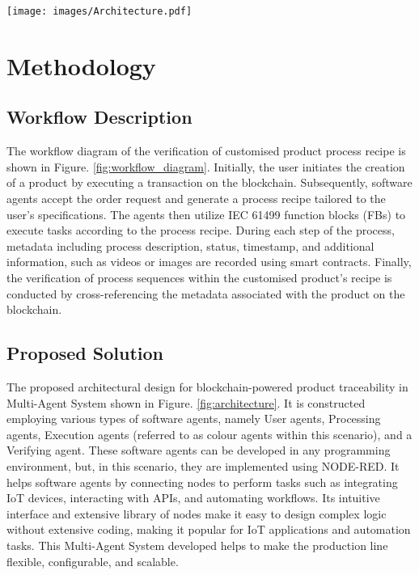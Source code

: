 \documentclass[conference]{IEEEtran}
\begin{document}
\begin{figure*}[!t]
	\centering
	\texttt{[image: images/Architecture.pdf]}
	\caption{Fostering Transparency: Architectural Design for Blockchain-Powered Product Traceability in Multi-Agent System}
	\label{fig:architecture}
\end{figure*}


\section{Methodology}
\label{sec:methodology}

\subsection{Workflow Description}

The workflow diagram of the verification of customised product process recipe is shown in Figure. \ref{fig:workflow_diagram}. Initially, the user initiates the creation of a product by executing a transaction on the blockchain. Subsequently, software agents accept the order request and generate a process recipe tailored to the user's specifications. The agents then utilize IEC 61499 function blocks (FBs) to execute tasks according to the process recipe. During each step of the process, metadata including process description, status, timestamp, and additional information, such as videos or images are recorded using smart contracts. Finally, the verification of process sequences within the customised product's recipe is conducted by cross-referencing the metadata associated with the product on the blockchain.


\subsection{Proposed Solution}

The proposed architectural design for blockchain-powered product traceability in Multi-Agent System shown in Figure.  \ref{fig:architecture}. It is constructed employing various types of software agents, namely User agents, Processing agents, Execution agents (referred to as colour agents within this scenario), and a Verifying agent. These software agents can be developed in any programming environment, but, in this scenario, they are implemented using NODE-RED.
It helps software agents by connecting nodes to perform tasks such as integrating IoT devices, interacting with APIs, and automating workflows. Its intuitive interface and extensive library of nodes make it easy to design complex logic without extensive coding, making it popular for IoT applications and automation tasks. This Multi-Agent System developed helps to make the production line flexible, configurable, and scalable.
\end{document}
